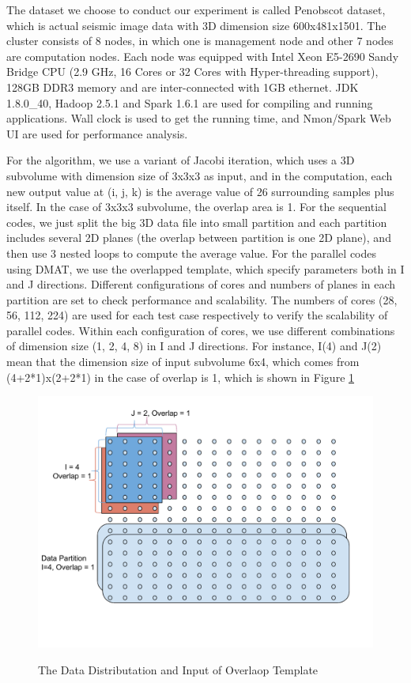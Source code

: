 The dataset we choose to conduct our experiment is called Penobscot dataset, which is actual seismic image data with 3D dimension size 600x481x1501. 
The cluster consists of 8 nodes, in which one is management node and other 7 nodes are computation nodes. Each node was equipped with Intel Xeon E5-2690 Sandy Bridge CPU (2.9 GHz, 16 Cores or 32 Cores with Hyper-threading support), 128GB DDR3 memory and are inter-connected with 1GB ethernet. 
JDK 1.8.0\_40, Hadoop 2.5.1 and Spark 1.6.1 are used for compiling and running applications. Wall clock is used to get the running time, and Nmon/Spark Web UI are used for performance analysis.

For the algorithm, we use a variant of Jacobi iteration, which uses a 3D subvolume with dimension size of 3x3x3 as input, and in the computation, each new output value at (i, j, k) is the average value of 26 surrounding samples plus itself. In the case of 3x3x3 subvolume, the overlap area is 1. 
For the sequential codes, we just split the big 3D data file into small partition and each partition includes several 2D planes (the overlap between partition is one 2D plane), and then use 3 nested loops to compute the average value. 
For the parallel codes using DMAT, we use the overlapped template, which specify parameters both in I and J directions. 
Different configurations of cores and numbers of planes in each partition are set to check performance and scalability. 
The numbers of cores (28, 56, 112, 224) are used for each test case respectively to verify the scalability of parallel codes. 
Within each configuration of cores, we use different combinations of dimension size (1, 2, 4, 8) in I and J directions. For instance, I(4) and J(2) mean that the dimension size of input subvolume 6x4, which comes from (4+2*1)x(2+2*1) in the case of overlap is 1, which is shown in Figure \ref{StencilData}

\begin{figure}[h]
\centering
\includegraphics[scale=0.7]{figures/StencilData.pdf}\\
\caption{The Data Distributation and Input of Overlaop Template}
\label{StencilData}
\end{figure}

